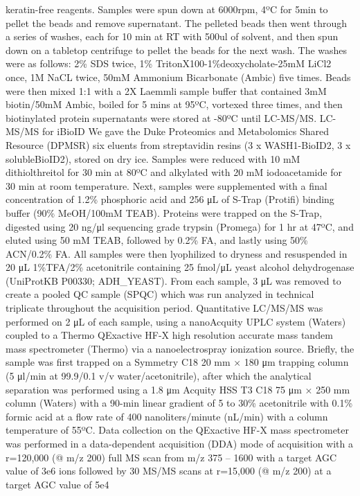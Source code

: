 keratin-free reagents. Samples were spun down at 6000rpm, 4ºC for 5min to pellet
the beads and remove supernatant. The pelleted beads then went through a series
of washes, each for 10 min at RT with 500ul of solvent, and then spun down on a
tabletop centrifuge to pellet the beads for the next wash. The washes were as
follows: 2\% SDS twice, 1\% TritonX100-1\%deoxycholate-25mM LiCl2 once, 1M NaCL
twice, 50mM Ammonium Bicarbonate (Ambic) five times. Beads were then mixed 1:1
with a 2X Laemmli sample buffer that contained 3mM biotin/50mM Ambic, boiled for
5 mins at 95ºC, vortexed three times, and then biotinylated protein supernatants
were stored at -80ºC until LC-MS/MS. 
LC-MS/MS for iBioID
We gave the Duke Proteomics and Metabolomics Shared Resource (DPMSR) six eluents
from streptavidin resins (3 x WASH1-BioID2, 3 x solubleBioID2), stored on dry
ice. Samples were reduced with 10 mM dithiolthreitol for 30 min at 80ºC and
alkylated with 20 mM iodoacetamide for 30 min at room temperature. Next, samples
were supplemented with a final concentration of 1.2\% phosphoric acid and 256 μL
of S-Trap (Protifi) binding buffer (90\% MeOH/100mM TEAB). Proteins were trapped
on the S-Trap, digested using 20 ng/μl sequencing grade trypsin (Promega) for 1
hr at 47ºC, and eluted using 50 mM TEAB, followed by 0.2\% FA, and lastly using
50\% ACN/0.2\% FA. All samples were then lyophilized to dryness and resuspended in
20 μL 1\%TFA/2\% acetonitrile containing 25 fmol/μL yeast alcohol dehydrogenase
(UniProtKB P00330; ADH_YEAST). From each sample, 3 μL was removed to create a
pooled QC sample (SPQC) which was run analyzed in technical triplicate
throughout the acquisition period.
Quantitative LC/MS/MS was performed on 2 μL of each sample, using a nanoAcquity
UPLC system (Waters) coupled to a Thermo QExactive HF-X high resolution accurate
mass tandem mass spectrometer (Thermo) via a nanoelectrospray ionization source.
Briefly, the sample was first trapped on a Symmetry C18 20 mm × 180 μm trapping
column (5 μl/min at 99.9/0.1 v/v water/acetonitrile), after which the analytical
separation was performed using a 1.8 μm Acquity HSS T3 C18 75 μm × 250 mm column
(Waters) with a 90-min linear gradient of 5 to 30\% acetonitrile with 0.1\% formic
acid at a flow rate of 400 nanoliters/minute (nL/min) with a column temperature
of 55ºC. Data collection on the QExactive HF-X mass spectrometer was performed
in a data-dependent acquisition (DDA) mode of acquisition with a r=120,000 (@
m/z 200) full MS scan from m/z 375 – 1600 with a target AGC value of 3e6 ions
followed by 30 MS/MS scans at r=15,000 (@ m/z 200) at a target AGC value of 5e4
